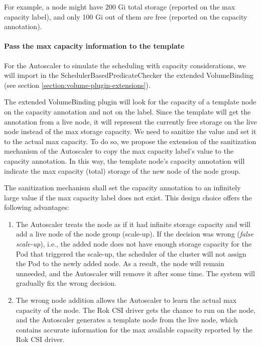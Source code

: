 For example, a node might have 200 Gi total storage (reported on the max
capacity label), and only 100 Gi out of them are free (reported on the capacity
annotation).

\paragraph*{Pass the max capacity information to the template}

For the Autoscaler to simulate the scheduling with capacity considerations, we
will import in the SchedulerBasedPredicateChecker the extended VolumeBinding
(see section \ref*{section:volume-plugin-extensions}).

The extended VolumeBinding plugin will look for the capacity of a template node
on the capacity annotation and not on the label. Since the template will get the
annotation from a live node, it will represent the currently free storage on the
live node instead of the max storage capacity. We need to sanitize the value and
set it to the actual max capacity. To do so, we propose the extension of the
sanitization mechanism of the Autoscaler to copy the max capacity label's value
to the capacity annotation. In this way, the template node's capacity annotation
will indicate the max capacity (total) storage of the new node of the node
group.

The sanitization mechanism shall set the capacity annotation to an infinitely
large value if the max capacity label does not exist. This design choice offers
the following advantages:
\begin{enumerate}
      \item The Autoscaler treats the node as if it had infinite storage
            capacity and will add a live node of the node group (scale-up). If
            the decision was wrong (\textit{false scale-up}), i.e., the added
            node does not have enough storage capacity for the Pod that
            triggered the scale-up, the scheduler of the cluster will not assign
            the Pod to the newly added node. As a result, the node will remain
            unneeded, and the Autoscaler will remove it after some time. The
            system will gradually fix the wrong decision.
      \item The wrong node addition allows the Autoscaler to learn the actual
            max capacity of the node. The Rok CSI driver gets the chance to run
            on the node, and the Autoscaler generates a template node from the
            live node, which contains accurate information for the max available
            capacity reported by the Rok CSI driver.
\end{enumerate}


